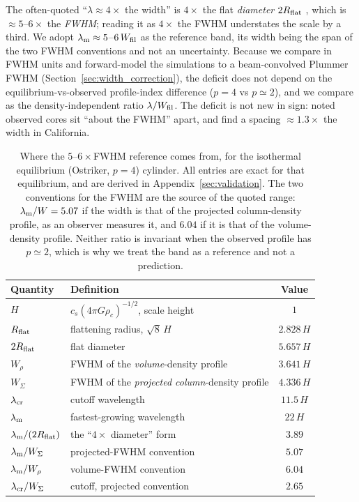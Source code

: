 \documentclass[usenatbib,twoside,twocolumn]{mnras}
\begin{document}
The often-quoted ``$\lambda\approx4\times$ the width'' is $4\times$ the flat \emph{diameter} $2R_{\rm flat}$ \citep{Inutsuka1992}, which is $\approx5$--$6\times$ the \emph{FWHM}; reading it as $4\times$ the FWHM understates the scale by a third. We adopt $\lambda_{\rm m}\approx5$--$6\,W_{\rm fil}$ as the reference band, its width being the span of the two FWHM conventions and not an uncertainty. Because we compare in FWHM units and forward-model the simulations to a beam-convolved Plummer FWHM (Section~\ref{sec:width_correction}), the deficit does not depend on the equilibrium-vs-observed profile-index difference ($p=4$ vs $p\simeq2$), and we compare as the density-independent ratio $\lambda/W_{\rm fil}$. The deficit is not new in sign: \citet{Fischera2012} noted observed cores sit ``about the FWHM'' apart, and \citet{Zhang2023cal} find a spacing $\approx1.3\times$ the width in California.

\begin{table}
\caption{Where the $5$--$6\times$FWHM reference comes from, for the isothermal equilibrium (Ostriker, $p=4$) cylinder. All entries are exact for that equilibrium, and are derived in Appendix~\ref{sec:validation}. The two conventions for the FWHM are the source of the quoted range: $\lambda_{\rm m}/W=5.07$ if the width is that of the projected column-density profile, as an observer measures it, and $6.04$ if it is that of the volume-density profile. Neither ratio is invariant when the observed profile has $p\simeq2$, which is why we treat the band as a reference and not a prediction.}
\label{tab:benchmark}
\footnotesize
\setlength{\tabcolsep}{4pt}
\begin{tabular}{llc}
\toprule
Quantity & Definition & Value \\
\midrule
$H$ & $c_s(4\pi G\rho_c)^{-1/2}$, scale height & $1$ \\
$R_{\rm flat}$ & flattening radius, $\sqrt{8}\,H$ & $2.828\,H$ \\
$2R_{\rm flat}$ & flat diameter & $5.657\,H$ \\
$W_{\rho}$ & FWHM of the \emph{volume}-density profile & $3.641\,H$ \\
$W_{\Sigma}$ & FWHM of the \emph{projected column}-density profile & $4.336\,H$ \\
$\lambda_{\rm cr}$ & cutoff wavelength & $11.5\,H$ \\
$\lambda_{\rm m}$ & fastest-growing wavelength & $22\,H$ \\
\midrule
$\lambda_{\rm m}/(2R_{\rm flat})$ & the ``$4\times$ diameter'' form & $3.89$ \\
$\lambda_{\rm m}/W_{\Sigma}$ & projected-FWHM convention & $5.07$ \\
$\lambda_{\rm m}/W_{\rho}$ & volume-FWHM convention & $6.04$ \\
$\lambda_{\rm cr}/W_{\Sigma}$ & cutoff, projected convention & $2.65$ \\
\bottomrule
\end{tabular}
\end{table}
\end{document}
